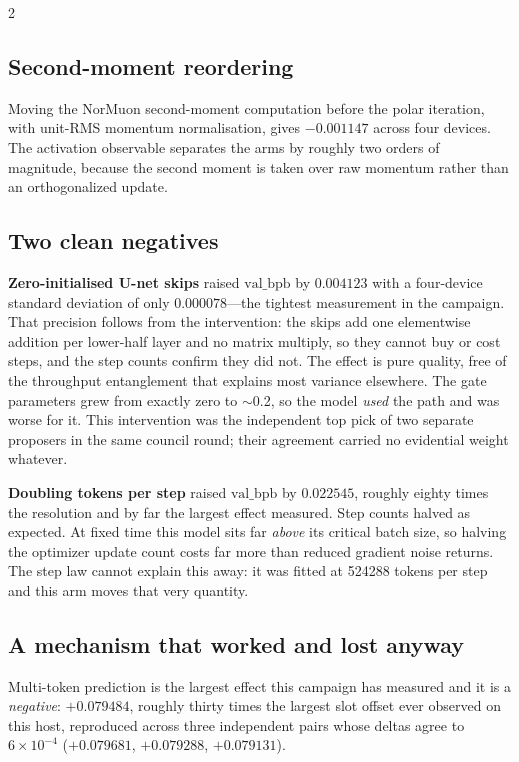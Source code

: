 \documentclass[10pt]{article}
\begin{document}
\begin{multicols}{2}
\subsection{Second-moment reordering}

Moving the NorMuon second-moment computation before the polar iteration, with unit-RMS
momentum normalisation, gives $-0.001147$ across four devices. The activation observable
separates the arms by roughly two orders of magnitude, because the second moment is taken
over raw momentum rather than an orthogonalized update.

\subsection{Two clean negatives}

\textbf{Zero-initialised U-net skips} raised $\mathrm{val\_bpb}$ by $0.004123$ with a
four-device standard deviation of only $0.000078$---the tightest measurement in the
campaign. That precision follows from the intervention: the skips add one elementwise
addition per lower-half layer and no matrix multiply, so they cannot buy or cost steps,
and the step counts confirm they did not. The effect is pure quality, free of the
throughput entanglement that explains most variance elsewhere. The gate parameters grew
from exactly zero to $\sim$0.2, so the model \emph{used} the path and was worse for it.
This intervention was the independent top pick of two separate proposers in the same
council round; their agreement carried no evidential weight whatever.

\textbf{Doubling tokens per step} raised $\mathrm{val\_bpb}$ by $0.022545$, roughly eighty
times the resolution and by far the largest effect measured. Step counts halved as
expected. At fixed time this model sits far \emph{above} its critical batch size, so
halving the optimizer update count costs far more than reduced gradient noise returns. The
step law cannot explain this away: it was fitted at 524288 tokens per step and this arm
moves that very quantity.

\subsection{A mechanism that worked and lost anyway}
\label{sec:mtp}

Multi-token prediction is the largest effect this campaign has measured and it is a
\emph{negative}: $+0.079484$, roughly thirty times the largest slot offset ever observed on
this host, reproduced across three independent pairs whose deltas agree to $6\times10^{-4}$
($+0.079681$, $+0.079288$, $+0.079131$).


\end{multicols}
\end{document}
